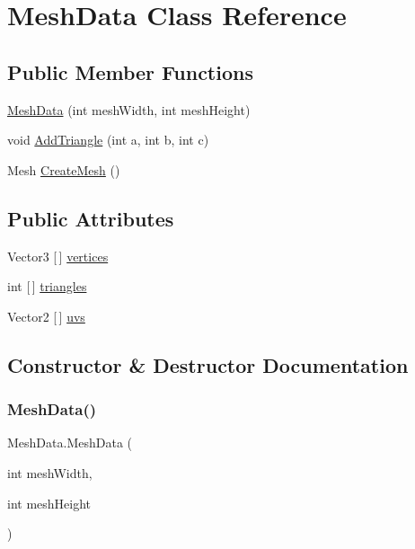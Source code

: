 \hypertarget{class_mesh_data}{}\section{Mesh\+Data Class Reference}
\label{class_mesh_data}
\subsection*{Public Member Functions}
\begin{DoxyCompactItemize}
\item 
\mbox{\hyperlink{class_mesh_data_a6a44cce7c0e7f8f229ee3be7d0590628}{Mesh\+Data}} (int mesh\+Width, int mesh\+Height)
\item 
void \mbox{\hyperlink{class_mesh_data_a1515ec040fe2639c6635564eea60979f}{Add\+Triangle}} (int a, int b, int c)
\item 
Mesh \mbox{\hyperlink{class_mesh_data_a9d813c3b2d1b1eb78bfcaaf11e04cf63}{Create\+Mesh}} ()
\end{DoxyCompactItemize}
\subsection*{Public Attributes}
\begin{DoxyCompactItemize}
\item 
Vector3 \mbox{[}$\,$\mbox{]} \mbox{\hyperlink{class_mesh_data_ae3f35f48b31703208a848cf265daa11b}{vertices}}
\item 
int \mbox{[}$\,$\mbox{]} \mbox{\hyperlink{class_mesh_data_af129fc7adecb83908ea1a4c1c3a1fdc0}{triangles}}
\item 
Vector2 \mbox{[}$\,$\mbox{]} \mbox{\hyperlink{class_mesh_data_aa3e087dedb7d67e1bd3cfb98ec50f13c}{uvs}}
\end{DoxyCompactItemize}


\subsection{Constructor \& Destructor Documentation}
\mbox{\label{class_mesh_data_a6a44cce7c0e7f8f229ee3be7d0590628}} 
\subsubsection{\texorpdfstring{Mesh\+Data()}{MeshData()}}
{\footnotesize\ttfamily Mesh\+Data.\+Mesh\+Data (\begin{DoxyParamCaption}\item[{int}]{mesh\+Width,  }\item[{int}]{mesh\+Height }\end{DoxyParamCaption})}



